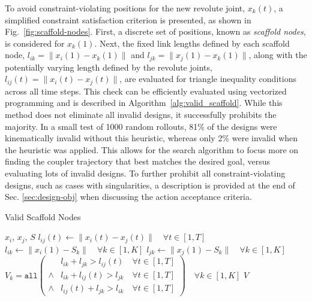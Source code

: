 To avoid constraint-violating positions for the new revolute joint, \( x_k(t) \), a simplified constraint satisfaction criterion is presented, as shown in Fig.~\ref{fig:scaffold-nodes}. First, a discrete set of positions, known as \textit{scaffold nodes}, is considered for \( x_k(1) \). Next, the fixed link lengths defined by each scaffold node, \( l_{ik} = \| x_i(1) - x_k(1) \| \) and \( l_{jk} = \| x_j(1) - x_k(1) \| \), along with the potentially varying length defined by the revolute joints, \( l_{ij}(t) = \| x_i(t) - x_j(t) \| \), are evaluated for triangle inequality conditions across all time steps. This check can be efficiently evaluated using vectorized programming and is described in Algorithm~\ref{alg:valid_scaffold}. While this method does not eliminate all invalid designs, it successfully prohibits the majority. In a small test of 1000 random rollouts, 81\% of the designs were kinematically invalid without this heuristic, whereas only 2\% were invalid when the heuristic was applied. This allows for the search algorithm to focus more on finding the coupler trajectory that best matches the desired goal, versus evaluating lots of invalid designs. To further prohibit all constraint-violating designs, such as cases with singularities, a description is provided at the end of Sec. \ref{sec:design-obj} when discussing the action acceptance criteria.

\begin{algorithm}[H]
\caption{Valid Scaffold Nodes}
\label{alg:valid_scaffold}
\begin{algorithmic}[1]
\Require $x_i$, $x_j$, $S$ 
\State $l_{ij}(t) \gets \|x_i(t) - x_j(t)\| \quad \forall t \in [1, T]$ 
\State $l_{ik} \gets \|x_i(1) - S_k\| \quad \forall k \in [1, K]$ 
\State $l_{jk} \gets \|x_j(1) - S_k\| \quad \forall k \in [1, K]$ 
\Statex
\State $V_k = \texttt{all} \left( 
    \begin{aligned}
        & l_{ik} + l_{jk} > l_{ij}(t) \quad \forall t \in [1, T] \\
        \land & l_{ik} + l_{ij}(t) > l_{jk} \quad \forall t \in [1, T] \\
        \land & l_{ij}(t) + l_{jk} > l_{ik} \quad \forall t \in [1, T] 
    \end{aligned} \right)
    \quad \forall k \in [1, K]$
\State \Return $V$
\end{algorithmic}
\end{algorithm}

